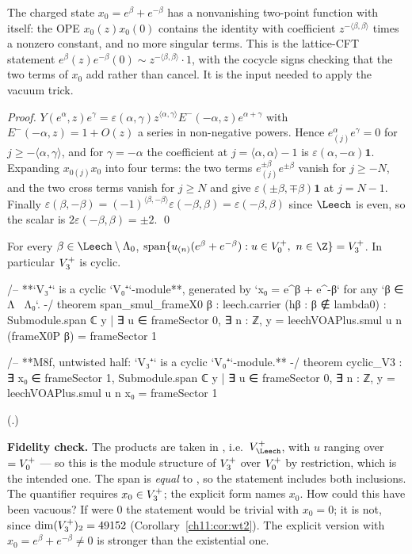 \begin{physics}
The charged state $x_0=e^\beta+e^{-\beta}$ has a nonvanishing two-point function with itself: the OPE $x_0(z)x_0(0)$ contains the identity with coefficient $z^{-\langle\beta,\beta\rangle}$ times a nonzero constant, and no more singular terms. This is the lattice-CFT statement $e^{\beta}(z)e^{-\beta}(0)\sim z^{-\langle\beta,\beta\rangle}\cdot1$, with the cocycle signs checking that the two terms of $x_0$ add rather than cancel. It is the input needed to apply the vacuum trick.
\end{physics}
\emph{Proof.}  $Y(e^\alpha,z)e^\gamma=\varepsilon(\alpha,\gamma)z^{\langle\alpha,\gamma\rangle}
E^-(-\alpha,z)e^{\alpha+\gamma}$ with $E^-(-\alpha,z)=1+O(z)$ a series in non-negative powers.
Hence $e^\alpha_{(j)}e^\gamma=0$ for $j\ge-\langle\alpha,\gamma\rangle$, and for $\gamma=-\alpha$ the
coefficient at $j=\langle\alpha,\alpha\rangle-1$ is $\varepsilon(\alpha,-\alpha)\mathbf 1$.  Expanding
$x_{0(j)}x_0$ into four terms: the two terms $e^{\pm\beta}_{(j)}e^{\pm\beta}$ vanish for
$j\ge-N$, and the two cross terms vanish for $j\ge N$ and give $\varepsilon(\pm\beta,\mp\beta)\mathbf
1$ at $j=N-1$.  Finally $\varepsilon(\beta,-\beta)=(-1)^{\langle\beta,-\beta\rangle}\varepsilon(-\beta,\beta)
=\varepsilon(-\beta,\beta)$ since $\Leech$ is even, so the scalar is $2\varepsilon(-\beta,\beta)=\pm2$. \qed

\begin{theorem}\label{ch11:thm:cyclicV3}
For every $\beta\in\Leech\setminus\Lambda_0$,
$\operatorname{span}\{u_{(n)}(e^\beta+e^{-\beta}) : u\in\chelVz,\ n\in\Z\}=\chelVt$.  In particular
$V_3^{+}$ is cyclic.
\end{theorem}
\begin{leancode}
/-- **`V₃⁺` is a cyclic `V₀⁺`-module**, generated by `x₀ = e^β + e^{-β}` for any `β ∈ Λ \ Λ₀`. -/
theorem span_smul_frameX0 {β : leech.carrier} (hβ : β ∉ lambda0) :
    Submodule.span ℂ {y | ∃ u ∈ frameSector 0, ∃ n : ℤ, y = leechVOAPlus.smul u n (frameX0P β)}
      = frameSector 1

/-- **M8f, untwisted half: `V₃⁺` is a cyclic `V₀⁺`-module.** -/
theorem cyclic_V3 : ∃ x₀ ∈ frameSector 1,
    Submodule.span ℂ {y | ∃ u ∈ frameSector 0, ∃ n : ℤ, y = leechVOAPlus.smul u n x₀}
      = frameSector 1
\end{leancode}
(.)
\begin{dictionary}
\textbf{Fidelity check.}  The products are taken in , i.e.\ $V_\Leech^+$, with
$u$ ranging over  $=V_0^{+}$ --- so this is the module structure of $V_3^{+}$
over $V_0^{+}$ by restriction, which is the intended one.  The span is \emph{equal} to
, so the statement includes both inclusions.  The quantifier
 requires $x_0\in V_3^{+}$; the explicit form names $x_0$.  How could this
have been vacuous?  If  were $0$ the statement would be trivial with $x_0=0$;
it is not, since $\dim(V_3^{+})_2=49152$ (Corollary~\ref{ch11:cor:wt2}).  The explicit version with
$x_0=e^\beta+e^{-\beta}\neq0$ is stronger than the existential one.
\end{dictionary}

